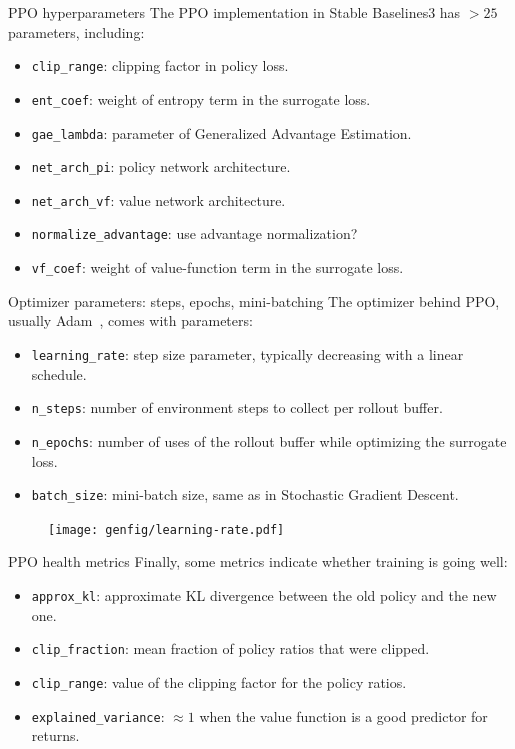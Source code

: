 \documentclass[10pt, aspectratio=1610]{beamer}
\begin{document}
\begin{frame}{PPO hyperparameters}
    The PPO implementation in Stable Baselines3 has $> 25$ parameters, including:
    \begin{itemize}
        \item \texttt{clip_range}: clipping factor in policy loss.
        \item \texttt{ent_coef}: weight of entropy term in the surrogate loss.
        \item \texttt{gae_lambda}: parameter of Generalized Advantage Estimation.
        \item \texttt{net_arch_pi}: policy network architecture.
        \item \texttt{net_arch_vf}: value network architecture.
        \item \texttt{normalize_advantage}: use advantage normalization?
        \item \texttt{vf_coef}: weight of value-function term in the surrogate loss.
    \end{itemize}
\end{frame}

\begin{frame}{Optimizer parameters: steps, epochs, mini-batching}
    The optimizer behind PPO, usually Adam~\cite{kingma2014adam}, comes with parameters:
    \begin{itemize}
        \item \texttt{learning_rate}: step size parameter, typically decreasing with a linear schedule.
        \item \texttt{n_steps}: number of environment steps to collect per rollout buffer.
        \item \texttt{n_epochs}: number of uses of the rollout buffer while optimizing the surrogate loss.
        \item \texttt{batch_size}: mini-batch size, same as in Stochastic Gradient Descent.
    \end{itemize}
    \begin{figure}
        \texttt{[image: genfig/learning-rate.pdf]}
    \end{figure}
\end{frame}

\begin{frame}{PPO health metrics}
    Finally, some metrics indicate whether training is going well:
    \begin{itemize}
        \item \texttt{approx_kl}: approximate KL divergence between the old policy and the new one.
        \item \texttt{clip_fraction}: mean fraction of policy ratios that were clipped.
        \item \texttt{clip_range}: value of the clipping factor for the policy ratios.
        \item \texttt{explained_variance}: $\approx 1$ when the value function is a good predictor for returns.
    \end{itemize}
\end{frame}
\end{document}
